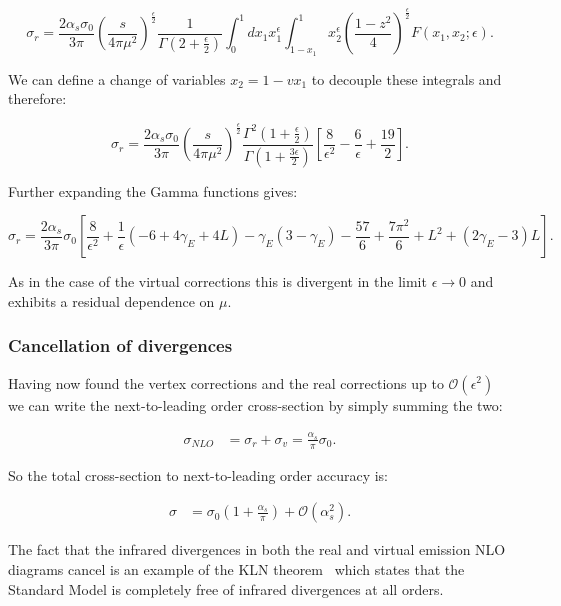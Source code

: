 		\begin{equation}
			\sigma_r = \frac{2\alpha_s\sigma_0}{3\pi}\left(\frac{s}{4\pi\mu^2}\right)^{\frac{\epsilon}{2}}\frac{1}{\Gamma(2+\frac{\epsilon}{2})}
			\int_0^1dx_1x_1^\epsilon\int^1_{1-x_1}x_2^\epsilon\left(\frac{1-z^2}{4}\right)^{\frac{\epsilon}{2}}F(x_1, x_2;\epsilon).
			\label{eqn:eqn72}
		\end{equation}

		We can define a change of variables $x_2=1-vx_1$ to decouple these integrals and therefore:

		\begin{equation}
			\sigma_r = \frac{2\alpha_s\sigma_0}{3\pi}\left(\frac{s}{4\pi\mu^2}\right)^{\frac{\epsilon}{2}}\frac{\Gamma^2
			\left(1+\frac{\epsilon}{2}\right)}{\Gamma\left(1+\frac{3\epsilon}{2}\right)}\left[\frac{8}{\epsilon^2} - \frac{6}{\epsilon} + \frac{19}{2}\right].
		\end{equation}

		Further expanding the Gamma functions gives:

		\begin{equation*}
			\sigma_r = \frac{2\alpha_s}{3\pi}\sigma_0\left[\frac{8}{\epsilon^2} + \frac{1}{\epsilon}\left(-6+4\gamma_E+4L\right)-
			\gamma_E(3-\gamma_E)-\frac{57}{6}+\frac{7\pi^2}{6}+L^2+(2\gamma_E-3)L\right].
		\end{equation*}

		As in the case of the virtual corrections this is divergent in the limit $\epsilon\rightarrow0$ and exhibits a residual
		dependence on $\mu$.

	\subsubsection{Cancellation of divergences}

		Having now found the vertex corrections and the real corrections up to $\mathcal{O}(\epsilon^2)$
		we can write the next-to-leading order cross-section by simply summing the two:

		\begin{align}
			\sigma_{NLO} &= \sigma_r + \sigma_v = \frac{\alpha_s}{\pi}\sigma_0.
		\end{align}

		So the total cross-section to next-to-leading order accuracy is:

		\begin{align}
			\sigma &= \sigma_0\left(1 + \frac{\alpha_s}{\pi}\right) + \mathcal{O}(\alpha_s^2).
		\end{align}

		The fact that the infrared divergences in both the real and virtual emission NLO diagrams cancel is an example of the
		KLN theorem~\cite{KLN} which states that the Standard Model is completely free of infrared divergences at all orders.
